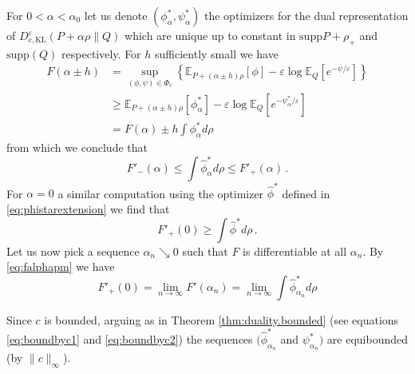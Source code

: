 \documentclass{amsart}
\theoremstyle{definition}
\theoremstyle{remark}
\numberwithin{equation}{section}
\begin{document}
For $0< \alpha < \alpha_0$ let us denote $(\phi^*_\alpha, \psi^*_{\alpha})$ the optimizers for 
the dual representation of $D_{c,\textrm{KL}}^\varepsilon(P + \alpha \rho\|Q)$  which are unique up to constant in $\textrm{supp}{P + \rho_+}$ and $\textrm{supp}(Q)$ respectively.  For $h$ sufficiently small we have 
\begin{equation}
\begin{aligned}
F(\alpha \pm h)&= \sup_{(\phi, \psi) \in \Phi_c} \left\{ \mathbb{E}_{P+(\alpha\pm h)\rho}[\phi] - \varepsilon \log \mathbb{E}_{Q}[e^{-\psi/\varepsilon}] \right\} \\
& \ge \mathbb{E}_{P+(\alpha\pm h)\rho}[\phi^*_\alpha] -  \varepsilon \log \mathbb{E}_{Q}[e^{-\psi^*_\alpha/\varepsilon}]
\\
&= F(\alpha)  \pm  h \int \phi^*_\alpha d \rho 
\end{aligned}
\end{equation}
from which we conclude that 
\begin{equation}\label{eq:falphapm}
F'_{-}(\alpha) \le \int \widehat{\phi}^*_\alpha d \rho  \le F'_{+}(\alpha)\,.
\end{equation}
For $\alpha=0$ a similar computation using the optimizer $\widehat{\phi}^*$ defined in \eqref{eq:phistarextension} we find that 
\begin{equation}\label{eq:fprimepluslower}
F'_{+}(0) \ge \int  \widehat{\phi}^* d \rho \,.
\end{equation}
Let us now pick a sequence $\alpha_n \searrow  0$ such that $F$ is differentiable at all $\alpha_n$. By \eqref{eq:falphapm} we have 
\begin{equation}
F'_+(0)=\lim_{n\to \infty} F'(\alpha_n) = \lim_{n \to \infty}\int \widehat{\phi}^*_{\alpha_n} d \rho
\end{equation}

Since $c$ is bounded, arguing as in Theorem \ref{thm:duality.bounded} (see equations \eqref{eq:boundbyc1} and \eqref{eq:boundbyc2}) 
the sequences $(\widehat{\phi}^*_{\alpha_n}$ and $\psi^*_{\alpha_n})$
are  equibounded (by $\|c\|_\infty$).   
\end{document}
